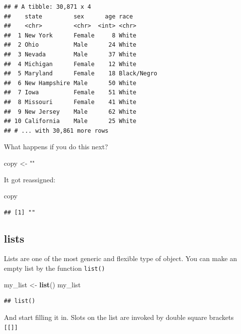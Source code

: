 \documentclass[]{book}
\newenvironment{Shaded}{\begin{snugshade}}{\end{snugshade}}
\newcommand{\KeywordTok}[1]{\textcolor[rgb]{0.13,0.29,0.53}{\textbf{#1}}}
\newcommand{\NormalTok}[1]{#1}
\newcommand{\StringTok}[1]{\textcolor[rgb]{0.31,0.60,0.02}{#1}}
\theoremstyle{definition}
\theoremstyle{definition}
\theoremstyle{definition}
\theoremstyle{remark}
\begin{document}
\begin{Shaded}
\begin{Highlighting}[]
\begin{Shaded}
\begin{Highlighting}[]
\begin{Shaded}
\begin{Highlighting}[]
\begin{verbatim}
## # A tibble: 30,871 x 4
##    state         sex      age race       
##    <chr>         <chr>  <int> <chr>      
##  1 New York      Female     8 White      
##  2 Ohio          Male      24 White      
##  3 Nevada        Male      37 White      
##  4 Michigan      Female    12 White      
##  5 Maryland      Female    18 Black/Negro
##  6 New Hampshire Male      50 White      
##  7 Iowa          Female    51 White      
##  8 Missouri      Female    41 White      
##  9 New Jersey    Male      62 White      
## 10 California    Male      25 White      
## # ... with 30,861 more rows
\end{verbatim}

What happens if you do this next?

\begin{Shaded}
\begin{Highlighting}[]
\NormalTok{copy <-}\StringTok{ ""}
\end{Highlighting}
\end{Shaded}

It got reassigned:

\begin{Shaded}
\begin{Highlighting}[]
\NormalTok{copy}
\end{Highlighting}
\end{Shaded}

\begin{verbatim}
## [1] ""
\end{verbatim}

\hypertarget{lists}{%
\subsection{lists}\label{lists}}

Lists are one of the most generic and flexible type of object. You can make an empty list by the function \texttt{list()}

\begin{Shaded}
\begin{Highlighting}[]
\NormalTok{my_list <-}\StringTok{ }\KeywordTok{list}\NormalTok{()}
\NormalTok{my_list}
\end{Highlighting}
\end{Shaded}

\begin{verbatim}
## list()
\end{verbatim}

And start filling it in. Slots on the list are invoked by double square brackets \texttt{{[}{[}{]}{]}}


\end{Highlighting}
\end{Shaded}
\end{Highlighting}
\end{Shaded}
\end{Highlighting}
\end{Shaded}
\end{document}

